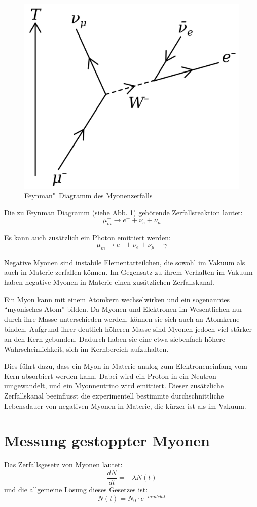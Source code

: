\documentclass[12pt,a4paper,ngerman]{report}
\begin{document}
		\begin{figure}[ht]
		\centering
		\includegraphics[width=.7\textwidth]{Bilder/Feynman_Myon}		
		\caption{Feynman"~Diagramm des Myonenzerfalls}
		\label{fig:Feynman_Myon}
	\end{figure}
	
	Die zu Feynman Diagramm (siehe Abb. \ref{fig:Feynman_Myon}) gehörende Zerfallsreaktion lautet:
	\[\mu^{-}_{m} \rightarrow e^{-} + \nu_e + \nu_{\mu} \]
	
	Es kann auch zusätzlich ein Photon emittiert werden:
	\[\mu^{-}_{m} \rightarrow e^{-} + \nu_e + \nu_{\mu} + \gamma \]
	
	Negative Myonen sind instabile Elementarteilchen, die sowohl im Vakuum als auch in Materie zerfallen können. Im Gegensatz zu ihrem Verhalten im Vakuum haben negative Myonen in Materie einen zusätzlichen Zerfallskanal.
	
	Ein Myon kann mit einem Atomkern wechselwirken und ein sogenanntes “myonisches Atom” bilden. Da Myonen und Elektronen im Wesentlichen nur durch ihre Masse unterschieden werden, können sie sich auch an Atomkerne binden. Aufgrund ihrer deutlich höheren Masse sind Myonen jedoch viel stärker an den Kern gebunden. Dadurch haben sie eine etwa siebenfach höhere Wahrscheinlichkeit, sich im Kernbereich aufzuhalten.
	
	Dies führt dazu, dass ein Myon in Materie analog zum Elektroneneinfang vom Kern absorbiert werden kann. Dabei wird ein Proton in ein Neutron umgewandelt, und ein Myonneutrino wird emittiert. Dieser zusätzliche Zerfallskanal beeinflusst die experimentell bestimmte durchschnittliche Lebensdauer von negativen Myonen in Materie, die kürzer ist als im Vakuum.

	\section{Messung gestoppter Myonen} \label{ch:Mess}
		Das Zerfallsgesetz von Myonen lautet:
		\[\frac{dN}{dt}= -\lambda N(t)\]
		und die allgemeine Lösung dieses Gesetzes ist:
		\[N(t) = N_0 \cdot e^{-lambda t}\]
		
\end{document}
